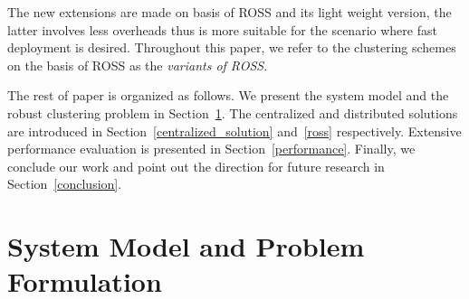 \documentclass[times]{ettauth}
\newcommand{\ie}{i.e., }
\theoremstyle{mytheoremstyle}
\theoremstyle{mytheoremstyle}
\theoremstyle{mytheoremstyle}
\begin{document}
%
The new extensions are made on basis of ROSS and its light weight version, the latter involves less overheads thus is more suitable for the scenario where fast deployment is desired.
Throughout this paper, we refer to the clustering schemes on the basis of ROSS as the \textit{variants of ROSS}.

The rest of paper is organized as follows. 
We present the system model and the robust clustering problem in Section~\ref{sec:model}. 
The centralized and distributed solutions are introduced in Section~\ref{centralized_solution} and~\ref{ross} respectively.
Extensive performance evaluation is presented in Section~\ref{performance}.
Finally, we conclude our work and point out the direction for future research in Section~\ref{conclusion}.



\section{System Model and Problem Formulation}
\label{sec:model}
\end{document}
